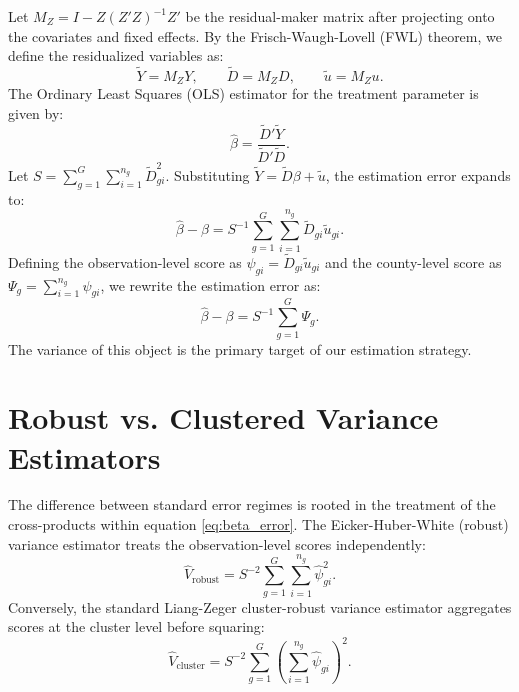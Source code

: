 \documentclass[11pt, letterpaper]{article}
\theoremstyle{remark}
\begin{document}
Let $M_Z = I - Z(Z'Z)^{-1}Z'$ be the residual-maker matrix after projecting onto the covariates and fixed effects. By the Frisch-Waugh-Lovell (FWL) theorem, we define the residualized variables as:
\begin{equation}
    \widetilde Y = M_Z Y, \qquad \widetilde D = M_Z D, \qquad \widetilde u = M_Z u.
\end{equation}
The Ordinary Least Squares (OLS) estimator for the treatment parameter is given by:
\begin{equation}
    \widehat\beta = \frac{\widetilde D'\widetilde Y}{\widetilde D'\widetilde D}.
\end{equation}
Let $S = \sum_{g=1}^G \sum_{i=1}^{n_g} \widetilde D_{gi}^2$. Substituting $\widetilde Y = \widetilde D\beta + \widetilde u$, the estimation error expands to:
\begin{equation}
    \widehat\beta - \beta = S^{-1} \sum_{g=1}^G \sum_{i=1}^{n_g} \widetilde D_{gi}\widetilde u_{gi}.
\end{equation}
Defining the observation-level score as $\psi_{gi} = \widetilde D_{gi}\widetilde u_{gi}$ and the county-level score as $\Psi_g = \sum_{i=1}^{n_g}\psi_{gi}$, we rewrite the estimation error as:
\begin{equation}
    \widehat\beta - \beta = S^{-1}\sum_{g=1}^G \Psi_g. \label{eq:beta_error}
\end{equation}
The variance of this object is the primary target of our estimation strategy.

\section{Robust vs. Clustered Variance Estimators}

The difference between standard error regimes is rooted in the treatment of the cross-products within equation \eqref{eq:beta_error}. The Eicker-Huber-White (robust) variance estimator treats the observation-level scores independently:
\begin{equation}
    \widehat V_{\text{robust}} = S^{-2} \sum_{g=1}^G \sum_{i=1}^{n_g} \widehat\psi_{gi}^2.
\end{equation}
Conversely, the standard Liang-Zeger cluster-robust variance estimator aggregates scores at the cluster level before squaring:
\begin{equation}
    \widehat V_{\text{cluster}} = S^{-2} \sum_{g=1}^G \left( \sum_{i=1}^{n_g}\widehat\psi_{gi} \right)^2.
\end{equation}
\end{document}
